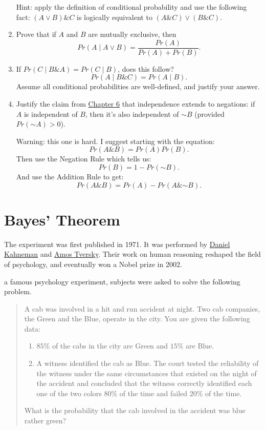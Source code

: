 \documentclass[justified]{tufte-book}
\providecommand{\tightlist}{%
  \setlength{\itemsep}{0pt}\setlength{\parskip}{0pt}}
\newcommand{\given}{\mid}
\renewcommand{\neg}{\mathbin{\sim}}
\renewcommand{\wedge}{\mathbin{\&}}
\newcommand{\p}{Pr}
\newenvironment{problem}{\begin{quote}\normalsize}{\end{quote}}
\theoremstyle{definition}
\theoremstyle{definition}
\theoremstyle{definition}
\theoremstyle{remark}
\begin{document}
\begin{enumerate}
  Hint: apply the definition of conditional probability and use the following fact: \((A \vee B) \wedge C\) is logically equivalent to \((A \wedge C) \vee (B \wedge C)\).
\item
  Prove that if \(A\) and \(B\) are mutually exclusive, then
  \[\p(A \given A \vee B) = \frac{ \p(A) }{ \p(A) + \p(B) }.\]
\item
  If \(\p(C \given B \wedge A) = \p(C \given B)\), does this follow?
  \[\p(A \given B \wedge C) = Pr(A \given B).\]
  Assume all conditional probabilities are well-defined, and justify your answer.
\item
  Justify the claim from \protect\hyperlink{declaring-independence}{Chapter 6} that independence extends to negations: if \(A\) is independent of \(B\), then it's also independent of \(\neg B\) (provided \(\p(\neg A) > 0\)).

  Warning: this one is hard. I suggest starting with the equation:
  \[ \p(A \wedge B) = \p(A) \p(B). \]
  Then use the Negation Rule which tells us:
  \[ \p(B) = 1 - \p(\neg B). \]
  And use the Addition Rule to get:
  \[ \p(A \wedge B) = \p(A) - \p(A \wedge \neg B).\]
\end{enumerate}

\hypertarget{chbayes}{%
\chapter{Bayes' Theorem}\label{chbayes}}

\begin{marginfigure}
The experiment was first published in 1971. It was performed by
\href{https://en.wikipedia.org/wiki/Daniel_Kahneman}{Daniel Kahneman}
and \href{https://en.wikipedia.org/wiki/Amos_Tversky}{Amos Tversky}.
Their work on human reasoning reshaped the field of psychology, and
eventually won a Nobel prize in 2002.
\end{marginfigure}

 a famous psychology experiment, subjects were asked to solve the following problem.

\begin{problem}
A cab was involved in a hit and run accident at night. Two cab
companies, the Green and the Blue, operate in the city. You are given
the following data:

\begin{enumerate}
\def\labelenumi{\arabic{enumi}.}
\tightlist
\item
  \(85\%\) of the cabs in the city are Green and \(15\%\) are Blue.
\item
  A witness identified the cab as Blue. The court tested the reliability
  of the witness under the same circumstances that existed on the night
  of the accident and concluded that the witness correctly identified
  each one of the two colors \(80\%\) of the time and failed \(20\%\) of
  the time.
\end{enumerate}

What is the probability that the cab involved in the accident was blue
rather green?
\end{problem}
\end{document}
